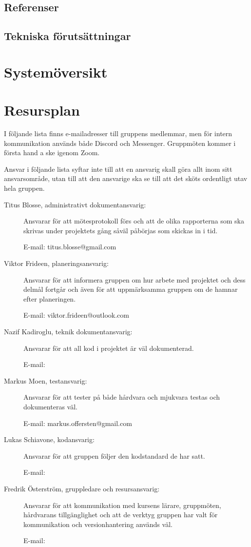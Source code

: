 \documentclass{article}
\begin{document}
\subsection{Referenser}

\subsection{Tekniska förutsättningar}

\section{Systemöversikt}

\section{Resursplan}

I följande lista finns e-mailadresser till gruppens medlemmar, men för intern kommunikation används både Discord och Messenger. Gruppmöten kommer i första hand a ske igenom Zoom.

Ansvar i följande lista syftar inte till att en ansvarig skall göra allt inom sitt ansvarsområde, utan till att den ansvarige ska se till att det sköts ordentligt utav hela gruppen.

\begin{description}
    \item[Titus Blosse, administrativt dokumentansvarig:] Ansvarar för att mötesprotokoll förs och att de olika rapporterna som ska skrivas under projektets gång såväl påbörjas som skickas in i tid.

    E-mail: titus.blosse@gmail.com

    \item[Viktor Frideen, planeringsansvarig:] Ansvarar för att informera gruppen om hur arbete med projektet och dess delmål fortgår och även för att uppmärksamma gruppen om de hamnar efter planeringen.

    E-mail: viktor.frideen@outlook.com

    \item[Nazif Kadiroglu, teknik dokumentansvarig:] Ansvarar för att all kod i projektet är väl dokumenterad.

    E-mail:

    \item[Markus Moen, testansvarig:] Ansvarar för att tester på både hårdvara och mjukvara testas och dokumenteras väl.

    E-mail: markus.offersten@gmail.com

    \item[Lukas Schiavone, kodansvarig:] Ansvarar för att gruppen följer den kodstandard de har satt.

    E-mail:

    \item[Fredrik Österström, gruppledare och resursansvarig:] Ansvarar för att kommunikation med kursens lärare, gruppmöten, hårdvarans tillgänglighet och att de verktyg gruppen har valt för kommunikation och versionhantering används väl.

    E-mail:
\end{description}
\end{document}
